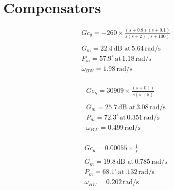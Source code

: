 \documentclass[11pt]{article}
\begin{document}
\clearpage
\section{Compensators}

\begin{gather*}
\boxed{Gc_{\theta} = -260 \times \frac{(s+0.8)(s+0.1)}{s(s+2)(s+100)}} \\
\\
G_m=22.4\,\mathrm{dB\,\, at\,} 5.64 \,\mathrm{rad/s}  \\
P_m=57.9^{\circ}\, \mathrm{at}\, 1.18 \,\mathrm{rad/s} \\
\omega_{BW}=1.98\, \mathrm{rad/s}\\
\end{gather*}

\begin{gather*}
\boxed{Gc_{\dot{h}} = 30909 \times \frac{(s+0.1)}{s(s+5)}} \\
\\
G_m=25.7\,\mathrm{dB\,\, at\,} 3.08 \,\mathrm{rad/s}  \\
P_m=72.3^{\circ}\, \mathrm{at}\, 0.351 \,\mathrm{rad/s} \\
\omega_{BW}=0.499\, \mathrm{rad/s}\\
\end{gather*}

\begin{gather*}
\boxed{Gc_{u} = 0.00055 \times \frac{1}{s}} \\
\\
G_m=19.8\,\mathrm{dB\,\, at\,} 0.785 \,\mathrm{rad/s}  \\
P_m=68.1^{\circ}\, \mathrm{at}\, .132 \,\mathrm{rad/s} \\
\omega_{BW}=0.202\, \mathrm{rad/s}\\
\end{gather*}

\end{document}
